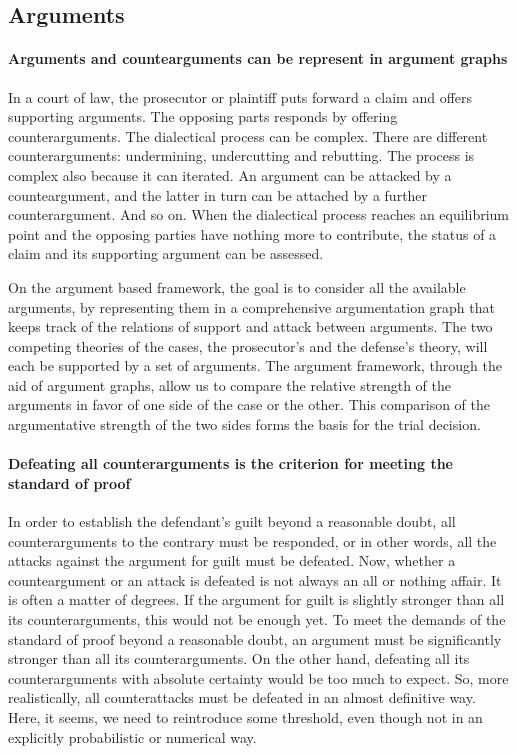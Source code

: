 \documentclass[10pt]{article}
\begin{document}
\subsection{Arguments}


\paragraph{Arguments and countearguments can be represent in argument graphs}

In a court of law, the prosecutor or plaintiff puts forward a claim and offers supporting arguments. The opposing parts responds by offering counterarguments. The dialectical process can be complex. There are different counterarguments: undermining,  undercutting and rebutting. The process is complex also because it can iterated. 
An argument can be attacked by a counteargument, and the latter in turn can be attached by a further counterargument. And so on. 
When the dialectical process reaches an equilibrium point and the opposing parties have nothing more to contribute, 
the status of a claim and its supporting argument can be assessed. 

On the argument based 
framework, the goal is to consider all the available arguments, by representing them in a comprehensive argumentation graph that 
keeps track of the relations of support and attack between arguments. The two competing theories of the cases, the prosecutor's and the defense's theory, will each
be supported by a set of arguments. The argument framework, through the aid of argument graphs, allow us to 
compare the relative strength of the arguments in favor of one side of the case or the other. This comparison of the argumentative strength of the two sides 
forms the basis for the trial decision.


\paragraph{Defeating all counterarguments is the criterion for meeting the standard of proof}

In order to establish the defendant's guilt beyond a reasonable doubt, all counterarguments 
to the contrary must be responded, or in other words, all the attacks against the argument for guilt must be 
defeated. Now, whether a counteargument or an attack is defeated 
is not always an all or nothing affair. It is often a matter of degrees. 
If the argument for guilt is slightly stronger than all its counterarguments, this would not be enough yet. 
To meet the demands of the standard of proof beyond a reasonable doubt, an argument must be significantly 
stronger than all its counterarguments. On the other hand, defeating all its counterarguments with absolute certainty would be too much to expect. 
So, more realistically, all counterattacks must be defeated in an almost definitive way. Here, it seems, we need 
to reintroduce some threshold, even though not in an explicitly probabilistic or numerical way. 
\end{document}
